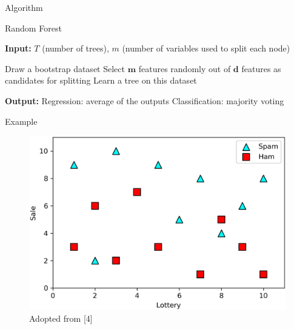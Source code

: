 \documentclass[serif, aspectratio=169]{beamer}
\newcommand{\IndState}{\State\hspace{\algorithmicindent}}
\begin{document}
\begin{frame}{Algorithm}
    \begin{algorithm}[H]
    \caption{Random Forest}\label{alg:RF}
    \begin{algorithmic}[1]
        \State \textbf{Input:} $T$ (number of trees), $m$ (number of variables used to split each node)
        
            \State Draw a bootstrap dataset
            \State \textcolor{deepred}{Select $\boldsymbol{m}$ features randomly out of $\boldsymbol{d}$ features as candidates for splitting}
            \State Learn a tree on this dataset
        \EndFor
        
        \State \textbf{Output:} 
        \IndState Regression: average of the outputs
        \IndState Classification: majority voting
    \end{algorithmic}
    \end{algorithm}
\end{frame}

\begin{frame}{Example}
    \begin{center}
    \begin{figure}[bh]
        \includegraphics[width=\textwidth]{pic/rf_e1.png}
        {\scriptsize Adopted from [4]}
    \end{figure}
    \endminipage
    \end{center}
\end{frame}
\end{document}
